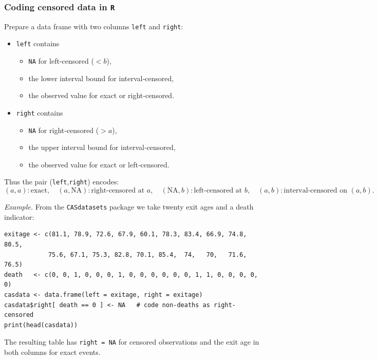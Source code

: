 \documentclass[11pt]{article}
\begin{document}
\subsubsection{Coding censored data in {\tt R}}

\noindent Prepare a data frame with two columns {\tt left} and {\tt right}:
\begin{itemize}
  \item {\tt left} contains
    \begin{itemize}
      \item {\tt NA} for left‐censored (\(<b\)),
      \item the lower interval bound for interval‐censored,
      \item the observed value for exact or right‐censored.
    \end{itemize}
  \item {\tt right} contains
    \begin{itemize}
      \item {\tt NA} for right‐censored (\(>a\)),
      \item the upper interval bound for interval‐censored,
      \item the observed value for exact or left‐censored.
    \end{itemize}
\end{itemize}
\noindent Thus the pair (\texttt{left},\texttt{right}) encodes:
\[
(a,a)\!:\text{exact},\quad
(a,\mathrm{NA})\!:\text{right‐censored at }a,\quad
(\mathrm{NA},b)\!:\text{left‐censored at }b,\quad
(a,b)\!:\text{interval‐censored on }(a,b).
\]

\smallskip
\noindent\emph{Example.}  From the {\tt CASdatasets} package we take twenty exit ages and a death indicator:
\begin{lstlisting}
exitage <- c(81.1, 78.9, 72.6, 67.9, 60.1, 78.3, 83.4, 66.9, 74.8, 80.5,
            75.6, 67.1, 75.3, 82.8, 70.1, 85.4,  74,   70,   71.6, 76.5)
death   <- c(0, 0, 1, 0, 0, 0, 1, 0, 0, 0, 0, 0, 0, 1, 1, 0, 0, 0, 0, 0)
casdata <- data.frame(left = exitage, right = exitage)
casdata$right[ death == 0 ] <- NA   # code non‐deaths as right‐censored
print(head(casdata))
\end{lstlisting}
\noindent The resulting table has {\tt right = NA} for censored observations and the exit age in both columns for exact events. \\
\end{document}

